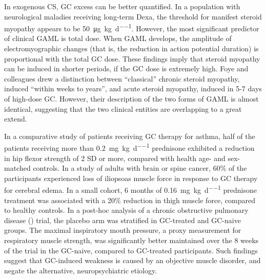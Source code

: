 \documentclass[12pt,english]{report}\usepackage[]{graphicx}\usepackage[]{color}
\begin{document}
In exogenous CS, GC excess can be better quantified. In a population
with neurological maladies receiving long-term Dexa, the threshold
for manifest steroid myopathy appears to be \SI{50}{\micro\gram\per\kilo\gram\per\day}\citep{vecht1994dose-effect}.
However, the most significant predictor of clinical GAML is total
dose\citep{batchelor1997steroid,shee1990risk}. When GAML develops,
the amplitude of electromyographic changes (that is, the reduction
in action potential duration) is proportional with the total GC dose\citep{coomes1965corticosteroid}.
These findings imply that steroid myopathy can be induced in shorter
periods, if the GC dose is extremely high. Foye and colleagues drew
a distinction between ``classical'' chronic steroid myopathy, induced
``within weeks to years'', and acute steroid myopathy, induced in
5-7 days of high-dose GC\citep{foye2014corticosteroid-induced}. However,
their description of the two forms of GAML is almost identical, suggesting
that the two clinical entities are overlapping to a great extend.

In a comparative study of patients receiving GC therapy for asthma,
half of the patients receiving more than \SI{0.2}{\milli\gram\per\kilo\gram\per\day}
prednisone exhibited a reduction in hip flexor strength of 2 SD or
more, compared with health age- and sex-matched controls\citep{bowyer1985steroid}.
In a study of adults with brain or spine cancer, 60\% of the participants
experienced loss of iliopsoas muscle force in response to GC therapy
for cerebral edema\citep{batchelor1997steroid}. In a small cohort,
6 months of \SI{0.16}{\milli\gram\per\kilo\gram\per\day} prednisone
treatment was associated with a 20\% reduction in thigh muscle force,
compared to healthy controls\citep{horber1985thigh}. In a post-hoc
analysis of a chronic obstructive pulmonary disease ()
trial, the placebo arm was stratified in GC-treated and GC-naive groups\citep{pansters2013synergistic}.
The maximal inspiratory mouth pressure, a proxy measurement for respiratory
muscle strength, was significantly better maintained over the 8 weeks
of the trial in the GC-naive, compared to GC-treated participants.
Such findings suggest that GC-induced weakness is caused by an objective
muscle disorder, and negate the alternative, neuropsychiatric etiology.
\end{document}
